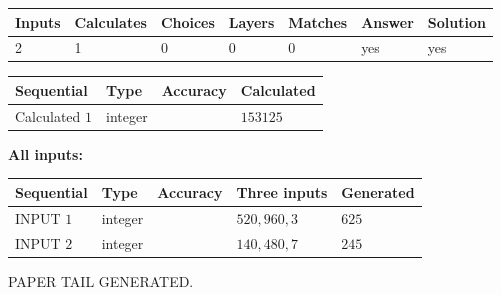 \documentclass{ctexart}
\begin{document}
 
\noindent{}
 
 

 
   
   
   
   
\noindent\begin{tabular}{|l|l|l|l|l|l|l|}
 \hline
Inputs & Calculates & Choices & Layers & Matches & Answer & Solution \\ \hline
 2  & 
 1  & 
 0
  & 
 0  & 
 0  & 
  yes & 
  yes 
  \\ \hline
 \end{tabular}
   
   
   
   
\noindent{}
   
   
  
  
\noindent\begin{tabular}{|l|l|l|l|}
\hline
 Sequential & Type & Accuracy & Calculated \\ 
\hline
 
 
  Calculated $  1 $ & integer &  & 
  $ 153125 $ 
 \\  \hline  
 \end{tabular}
   
   
   
   
\noindent\vspace{0.1in}\hspace{-0.08in} {\textbf{\Large{All inputs: }}}
   
   
  
  
\noindent\begin{tabular}{|l|l|l|l|l|}
\hline
 Sequential & Type & Accuracy & Three inputs & Generated \\ 
\hline
 
 
  INPUT $  1 $ & integer &  & $
 520
 , 
 960
 , 
 3
 $ & $ 625 $ 
 \\  \hline  
 
 
  INPUT $  2 $ & integer &  & $
 140
 , 
 480
 , 
 7
 $ & $ 245 $ 
 \\  \hline  
 \end{tabular}
   
   
   
   
   
   
 \vspace{0.2in}
 
   
   
\vspace{2.0in} PAPER TAIL GENERATED.
   
\end{document}
